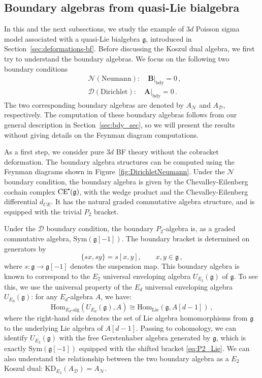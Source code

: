 \documentclass[11pt]{article}
\newcommand{\CE}{Chevalley-Eilenberg }
\newcommand\sbullet[1][.5]{\mathbin{\vcenter{\hbox{\scalebox{#1}{$\bullet$}}}}}
\numberwithin{equation}{section}
\begin{document}
\subsection{Boundary algebras from quasi-Lie bialgebra}
In this and the next subsections, we study the example of $3d$ Poisson sigma model associated with a quasi-Lie bialgebra $\mathfrak{g}$, introduced in Section~\ref{sec:deformations-bf}. Before discussing the Koszul dual algebra, we first try to understand the boundary algebras. We focus on the following two boundary conditions 
\begin{equation}
	\begin{aligned}
		&\mathcal{N} (\text{Neumann}):\quad  \boldsymbol{B}|_{\text{bdy}} = 0\,,\\
		&\mathcal{D} (\text{Dirichlet}):\quad  \boldsymbol{A}|_{\text{bdy}} = 0\,.
	\end{aligned}
\end{equation}
The two corresponding boundary algebras are denoted by $A_{\mathcal{N}}$ and $A_{\mathcal{D}}$, respectively. The computation of these boundary algebras follows from our general description in Section~\ref{sec:bdy_sec}, so we will present the results without giving details on the Feynman diagram computations. 

As a first step, we consider pure $3d$ BF theory without the cobracket deformation. The boundary algebra structures can be computed using the Feynman diagrams shown in Figure~\ref{fig:DirichletNeumann}. Under the $\mathcal{N}$ boundary condition, the boundary algebra is given by the Chevalley-Eilenberg cochain complex $\mathrm{CE}^{\sbullet}(\mathfrak{g})$, with the wedge product and the \CE differential $d_{CE}$. It has the natural graded commutative algebra structure, and is equipped with the trivial $P_2$ bracket.

Under the $\mathcal{D}$ boundary condition, the boundary $P_2$-algebra is, as a graded commutative algebra, $\mathrm{Sym}(\mathfrak{g}[-1])$. The boundary bracket is determined on generators by
\begin{equation}\label{eq:P2_Lie}
\{sx,sy\} = s[x,y],\qquad x,y\in\mathfrak{g}\,,
\end{equation}
where $s:\mathfrak{g}\to \mathfrak{g}[-1]$ denotes the suspension map. This boundary algebra is known to correspond to the $E_2$ universal enveloping algebra $U_{E_2}(\mathfrak{g})$ of $\mathfrak{g}$. To see this, we use the universal property of the $E_d$ universal enveloping algebra $U_{E_d}(\mathfrak{g})$: for any $E_d$-algebra $A$, we have:
\begin{equation}
\mathrm{Hom}_{E_d\text{-alg}}(U_{E_d}(\mathfrak{g}),A) \cong \mathrm{Hom}_{\text{Lie}}(\mathfrak{g},A[d-1])\,,
\end{equation}
where the right-hand side denotes the set of Lie algebra homomorphisms from $\mathfrak{g}$ to the underlying Lie algebra of $A[d-1]$. Passing to cohomology, we can identify $U_{E_2}(\mathfrak{g})$ with the free Gerstenhaber algebra generated by $\mathfrak{g}$, which is exactly $\mathrm{Sym}(\mathfrak{g}[-1])$ equipped with the shifted bracket \eqref{eq:P2_Lie}. We can also understand the relationship between the two boundary algebra as a $E_2$ Koszul dual: $\mathrm{KD}_{E_2}(A_{\mathcal{D}}) = A_{\mathcal{N}}$. 
\end{document}
